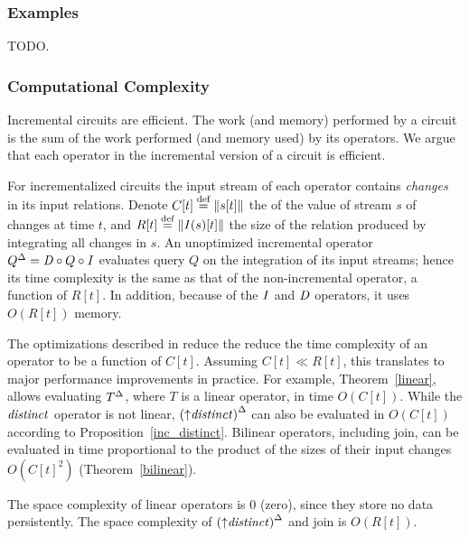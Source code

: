 \subsubsection{Examples}

TODO.

\subsubsection{Computational Complexity}\label{sec:relational-complexity}

Incremental circuits are efficient.  The work (and memory) performed by a circuit
is the sum of the work performed (and memory used) by its operators.
We argue that each operator in the incremental version of a circuit is efficient.

For incrementalized circuits the input stream of each operator contains \emph{changes} in
its input relations.  Denote $C[t] \stackrel{\textrm{\scriptsize def}}{=} \| s[t] \|$ the 
of the value of stream $s$ of changes at time $t$, and $R[t] \stackrel{\textrm{\scriptsize def}}{=}
\| \mathit{I}(s)[t] \|$ the size of the relation produced by integrating all changes in
$s$.  An unoptimized incremental operator ${Q}^{\Delta} = \mathit{D} \circ Q \circ \mathit{I}$
evaluates query $Q$ on the integration of its input streams; hence its time
complexity  is the same as that of the non-incremental operator, a function of
$R[t]$.  In addition, because of the $\mathit{I}$ and $\mathit{D}$ operators, it uses $O(R[t])$ memory.

The optimizations described in  reduce the
reduce the time complexity of an operator to be a function of $C[t]$.  Assuming $C[t] \ll
R[t]$, this translates to major performance improvements in practice.  For
example, Theorem~\ref{linear}, allows evaluating ${T}^{\Delta}$, where $T$ is a
linear operator, in time $O(C[t])$.  While the $\mathit{distinct}$ operator is not
linear, ${({\uparrow}\mathit{distinct})}^{\Delta}$ can also be evaluated in $O(C[t])$ according to
Proposition~\ref{inc_distinct}.  Bilinear operators, including join, can be
evaluated in time proportional to the product of the sizes of their input
changes $O(C[t]^2)$ (Theorem~\ref{bilinear}).  

The space complexity of linear operators is 0 (zero), since they store no
data persistently.  The space complexity of ${({\uparrow}\mathit{distinct})}^{\Delta}$ and 
join is $O(R[t])$.